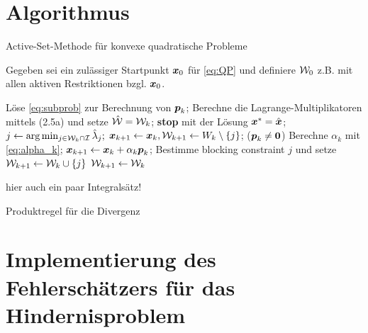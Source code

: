 \section{Algorithmus}
\label{anhang:B.3}

\begin{algorithm}[H]
\caption{Active-Set-Methode für konvexe quadratische Probleme}
Gegeben sei ein zulässiger Startpunkt $\boldsymbol x_0$ für \eqref{eq:QP} und definiere $\mathcal W_0$ z.B. mit allen aktiven Restriktionen bzgl. $\boldsymbol x_0$.
\begin{algorithmic}
\State Löse \eqref{eq:subprob} zur Berechnung von $\boldsymbol p_k$;
\State Berechne die Lagrange-Multiplikatoren mittels (2.5a)
\State \quad und setze $\hat{\mathcal W} = \mathcal W_k$;
\State \textbf{stop} mit der Lösung $\boldsymbol x^* = \hat{\boldsymbol x}$;
\Else
\State $j \leftarrow \arg\min_{j\in \mathcal W_k \cap \mathcal I} \hat\lambda_j;$
\State $\boldsymbol x_{k+1} \leftarrow \boldsymbol x_k, \mathcal W_{k+1} \leftarrow W_k \setminus \{j\}$;
\EndIf
\Else \quad ($\boldsymbol p_k \not= \boldsymbol 0$)
\State Berechne $\alpha_k$ mit \eqref{eq:alpha_k};
\State $\boldsymbol x_{k+1} \leftarrow  \boldsymbol x_k + \alpha_k\boldsymbol p_k$;
\State Bestimme  blocking constraint $j$ und setze $\mathcal W_{k+1} \leftarrow \mathcal W_k \cup \{j\}$
\Else
\State $\mathcal W_{k+1} \leftarrow \mathcal W_k$
\EndIf
\EndIf
\EndFor
\end{algorithmic}
\end{algorithm}







\label{anhang:C}

hier auch ein paar Integralsätz!

Produktregel für die Divergenz






\label{anhang:D}

\section{Implementierung des Fehlerschätzers für das Hindernisproblem}




